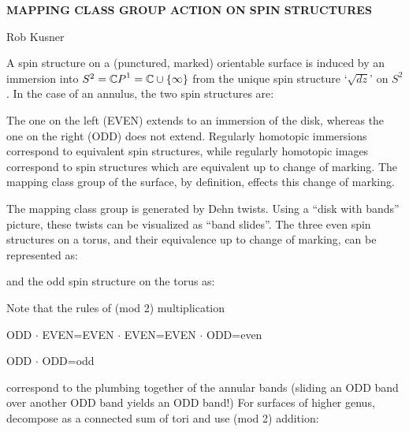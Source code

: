 


\def\epsfsize#1#2{0.5#1}

\setlength{\textwidth}{450pt}
\setlength{\textheight}{600pt}
\setlength{\topmargin}{0pt}
\setlength{\oddsidemargin}{0pt}
\setlength{\evensidemargin}{0pt}

\pagestyle{empty}



\centerline{\bf MAPPING CLASS GROUP ACTION ON SPIN STRUCTURES}
\medskip
\centerline{Rob Kusner}
\bigskip

A spin structure on a (punctured, marked) orientable 
surface is induced by an
immersion into $S^2={\Bbb CP}^1={\Bbb C}\cup\{\infty\}$ from the unique
spin structure `$\sqrt{dz}$' on $S^2$.
In the case of an annulus, the two spin structures are:

\centerline{ \hskip1.5in
}

The one on the left (EVEN) extends to an immersion of the disk,
whereas the one on the right (ODD) does not extend.  Regularly
homotopic immersions correspond to equivalent spin structures,
while regularly homotopic images correspond to spin structures
which are equivalent up to change of marking.  The mapping class
group of the surface, by definition, effects this change of
marking.

The mapping class group is generated by 
Dehn twists.  Using a ``disk with
bands'' picture, these twists can be visualized as ``band slides''.
The three even spin structures on a torus, and their equivalence 
up to change of marking, can be represented as:



\centerline{}

\noindent
and the odd spin structure on the torus as:   


\centerline{}
\noindent
Note that the rules of (mod 2) multiplication\hfill\break
\medskip
\centerline{ODD$\,\cdot\,$EVEN=EVEN$\,\cdot\,$EVEN=EVEN$\,
\cdot\,$ODD=even}
\smallskip
\centerline{ODD$\,\cdot\,$ODD=odd}
\smallskip\noindent
correspond to the plumbing 
together of the
annular bands (sliding an ODD band over another ODD band
yields an ODD band!)
For surfaces of higher genus, 
decompose as a connected sum of tori and use (mod 2) addition:

